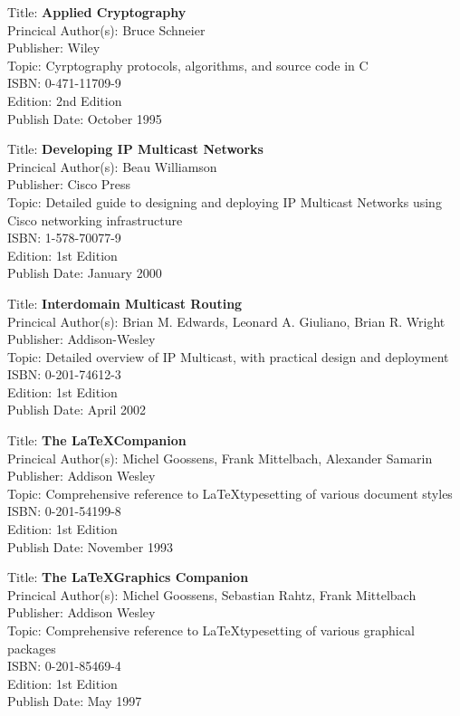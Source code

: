 Title: 	\textbf{Applied Cryptography}	\\
Princical Author(s): 	Bruce Schneier  \\
Publisher:	Wiley	\\	
Topic:		Cyrptography protocols, algorithms, and source code in C \\
ISBN:			0-471-11709-9 \\
Edition:		2nd Edition \\
Publish Date:		October 1995


Title: 	\textbf{Developing IP Multicast Networks}	\\
Princical Author(s): 	Beau Williamson  \\
Publisher:	Cisco Press	\\	
Topic:		Detailed guide to designing and deploying IP Multicast Networks using Cisco networking infrastructure \\
ISBN:			1-578-70077-9 \\
Edition:		1st Edition \\
Publish Date:		January 2000


Title: 	\textbf{Interdomain Multicast Routing}	\\
Princical Author(s): 	Brian M. Edwards, Leonard A. Giuliano, Brian R. Wright\\
Publisher:	Addison-Wesley	\\	
Topic:		Detailed overview of IP Multicast, with practical design and deployment \\
ISBN:			0-201-74612-3 \\
Edition:		1st Edition \\
Publish Date:		April 2002


Title: 	\textbf{The \LaTeX  Companion}	\\
Princical Author(s): 	Michel Goossens, Frank Mittelbach, Alexander Samarin  \\
Publisher:	Addison Wesley	\\	
Topic:		Comprehensive reference to \LaTeX typesetting of various document styles \\
ISBN:			0-201-54199-8 \\
Edition:		1st Edition \\
Publish Date:		November 1993


Title: 	\textbf{The \LaTeX Graphics Companion}	\\
Princical Author(s): 	Michel Goossens, Sebastian Rahtz, Frank Mittelbach  \\
Publisher:	Addison Wesley	\\	
Topic:		Comprehensive reference to \LaTeX typesetting of various graphical packages \\
ISBN:			0-201-85469-4 \\
Edition:		1st Edition \\
Publish Date:		May 1997

